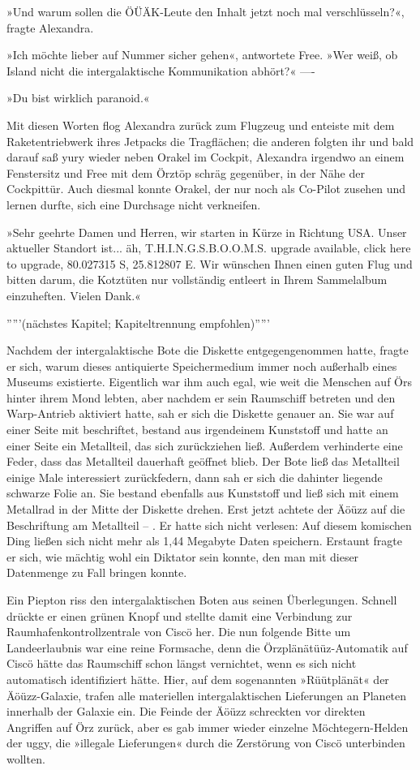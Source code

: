 »Und warum sollen die ÖÜÄK-Leute den Inhalt jetzt noch mal verschlüsseln?«, fragte Alexandra.

»Ich möchte lieber auf Nummer sicher gehen«, antwortete Free. »Wer weiß, ob Island nicht die intergalaktische Kommunikation abhört?«
----

»Du bist wirklich paranoid.«

Mit diesen Worten flog Alexandra zurück zum Flugzeug und enteiste mit dem Raketentriebwerk ihres Jetpacks die Tragflächen; die anderen folgten ihr und bald darauf saß yury wieder neben Orakel im Cockpit, Alexandra irgendwo an einem Fenstersitz und Free mit dem Örztöp schräg gegenüber, in der Nähe der Cockpittür. Auch diesmal konnte Orakel, der nur noch als Co-Pilot zusehen und lernen durfte, sich eine Durchsage nicht verkneifen.

»Sehr geehrte Damen und Herren, wir starten in Kürze in Richtung USA. Unser aktueller Standort ist... äh, T.H.I.N.G.S.B.O.O.M.S. upgrade available, click here to upgrade, 80.027315 S, 25.812807 E. Wir wünschen Ihnen einen guten Flug und bitten darum, die Kotztüten nur vollständig entleert in Ihrem Sammelalbum einzuheften. Vielen Dank.«


'''''(nächstes Kapitel; Kapiteltrennung empfohlen)'''''

Nachdem der intergalaktische Bote die Diskette entgegengenommen hatte, fragte er sich, warum dieses antiquierte Speichermedium immer noch außerhalb eines Museums existierte. Eigentlich war ihm auch egal, wie weit die Menschen auf Örs hinter ihrem Mond lebten, aber nachdem er sein Raumschiff betreten und den Warp-Antrieb aktiviert hatte, sah er sich die Diskette genauer an. Sie war auf einer Seite mit  beschriftet, bestand aus irgendeinem Kunststoff und hatte an einer Seite ein Metallteil, das sich zurückziehen ließ. Außerdem verhinderte eine Feder, dass das Metallteil dauerhaft geöffnet blieb. Der Bote ließ das Metallteil einige Male interessiert zurückfedern, dann sah er sich die dahinter liegende schwarze Folie an. Sie bestand ebenfalls aus Kunststoff und ließ sich mit einem Metallrad in der Mitte der Diskette drehen. Erst jetzt achtete der Äöüzz auf die Beschriftung am Metallteil – . Er hatte sich nicht verlesen: Auf diesem komischen Ding ließen sich nicht mehr als 1,44 Megabyte Daten speichern. Erstaunt fragte er sich, wie mächtig wohl ein Diktator sein konnte, den man mit dieser Datenmenge zu Fall bringen konnte.

Ein Piepton riss den intergalaktischen Boten aus seinen Überlegungen. Schnell drückte er einen grünen Knopf und stellte damit eine Verbindung zur Raumhafenkontrollzentrale von Ciscö her. Die nun folgende Bitte um Landeerlaubnis war eine reine Formsache, denn die Örzplänätüüz-Automatik auf Ciscö hätte das Raumschiff schon längst vernichtet, wenn es sich nicht automatisch identifiziert hätte. Hier, auf dem sogenannten »Rüütplänät« der Äöüzz-Galaxie, trafen alle materiellen intergalaktischen Lieferungen an Planeten innerhalb der Galaxie ein. Die Feinde der Äöüzz schreckten vor direkten Angriffen auf Örz zurück, aber es gab immer wieder einzelne Möchtegern-Helden der uggy, die »illegale Lieferungen« durch die Zerstörung von Ciscö unterbinden wollten.

